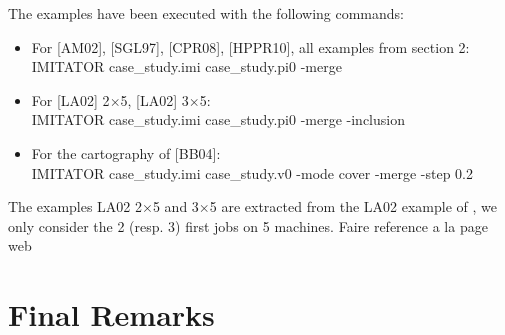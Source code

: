 \documentclass{article}
\newcommand{\hytech}{{\sc HyTech}}
\newcommand{\trex}{\textsc{TReX}}
\begin{document}
The examples have been executed with the following commands:
\begin{itemize}
 \item For [AM02], [SGL97], [CPR08], [HPPR10], all examples from section 2:\\ IMITATOR case\_study.imi case\_study.pi0 -merge 
 \item For [LA02] 2$\times$5, [LA02] 3$\times$5:\\ IMITATOR case\_study.imi case\_study.pi0 -merge -inclusion 
 \item For the cartography of [BB04]:\\ IMITATOR case\_study.imi case\_study.v0 -mode cover -merge -step 0.2 
\end{itemize}

The examples LA02 2$\times$5 and 3$\times$5 are extracted from the LA02 example of \cite{am02}, we only consider the 2 (resp. 3) first jobs on 5 machines.
Faire reference a la page web
\section{Final Remarks}

\end{document}
